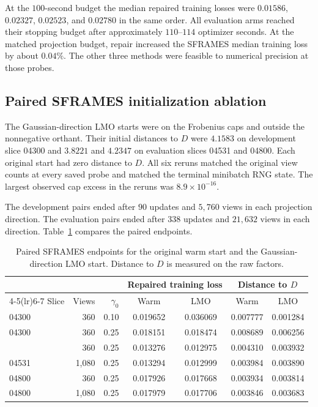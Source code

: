 \documentclass[11pt]{article}
\begin{document}
At the \(100\)-second budget the median repaired training losses were
\(0.01586\), \(0.02327\), \(0.02523\), and \(0.02780\) in the same order.
All evaluation arms reached their stopping budget after approximately
\(110\)--\(114\) optimizer seconds. At the matched projection budget,
repair increased the SFRAMES median training loss by about \(0.04\%\).
The other three methods were feasible to numerical precision at those probes.

\subsection{Paired SFRAMES initialization ablation}

The Gaussian-direction LMO starts were on the Frobenius caps and outside the
nonnegative orthant. Their initial distances to \(D\) were \(4.1583\) on
development slice 04300 and \(3.8221\) and \(4.2347\) on evaluation slices
04531 and 04800. Each original start had zero distance to \(D\). All six
reruns matched the original view counts at every saved probe and matched the
terminal minibatch RNG state. The largest observed cap excess in the reruns
was \(8.9\times 10^{-16}\).

The development pairs ended after \(90\) updates and \(5{,}760\) views in
each projection direction. The evaluation pairs ended after \(338\)
updates and \(21{,}632\) views in each direction. Table~\ref{tab:lmo-start}
compares the paired endpoints.

\begin{table}[htbp]
\centering
\caption{Paired SFRAMES endpoints for the original warm start and the
Gaussian-direction LMO start. Distance to \(D\) is measured on the raw factors.}
\label{tab:lmo-start}
\small
\begin{tabular}{@{}lrrcccc@{}}
\toprule
 & & & \multicolumn{2}{c}{Repaired training loss} &
         \multicolumn{2}{c}{Distance to \(D\)} \\
\cmidrule(lr){4-5}\cmidrule(lr){6-7}
Slice & Views & \(\gamma_0\) & Warm & LMO & Warm & LMO \\
\midrule
04300 &   360 & 0.10 & 0.019652 & 0.036069 & 0.007777 & 0.001284 \\
04300 &   360 & 0.25 & 0.018151 & 0.018474 & 0.008689 & 0.006256 \\
\addlinespace
04531 &   360 & 0.25 & 0.013276 & 0.012975 & 0.004310 & 0.003932 \\
04531 & 1,080 & 0.25 & 0.013294 & 0.012999 & 0.003984 & 0.003890 \\
04800 &   360 & 0.25 & 0.017926 & 0.017668 & 0.003934 & 0.003814 \\
04800 & 1,080 & 0.25 & 0.017979 & 0.017706 & 0.003846 & 0.003683 \\
\bottomrule
\end{tabular}
\end{table}
\end{document}
